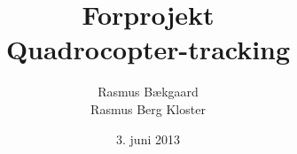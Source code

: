 \documentclass[oneside, 12pt]{memoir}
\title{Forprojekt
\\
Quadrocopter-tracking}
\date{3. juni 2013}
\author{Rasmus Bækgaard\\Rasmus Berg Kloster}
\begin{document}
\begin{titlingpage}
  \maketitle
\end{titlingpage}

\newpage
\tableofcontents*
\listoffixmes 










\end{document}
